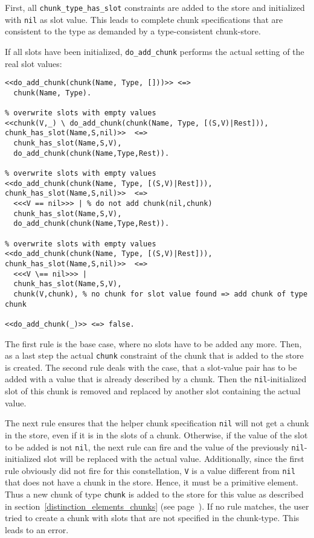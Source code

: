 First, all \lstinline|chunk_type_has_slot| constraints are added to the store and initialized with \lstinline|nil| as slot value. This leads to complete chunk specifications that are consistent to the type as demanded by a type-consistent chunk-store.

If all slots have been initialized, \lstinline|do_add_chunk| performs the actual setting of the real slot values:
  
\begin{lstlisting}[caption={Additional rules for adding chunks}]  
% base case
<<do_add_chunk(chunk(Name, Type, []))>> <=> 
  chunk(Name, Type). 

% overwrite slots with empty values
<<chunk(V,_) \ do_add_chunk(chunk(Name, Type, [(S,V)|Rest])), chunk_has_slot(Name,S,nil)>>  <=>
  chunk_has_slot(Name,S,V), 
  do_add_chunk(chunk(Name,Type,Rest)).

% overwrite slots with empty values  
<<do_add_chunk(chunk(Name, Type, [(S,V)|Rest])), chunk_has_slot(Name,S,nil)>>  <=> 
  <<<V == nil>>> | % do not add chunk(nil,chunk)
  chunk_has_slot(Name,S,V), 
  do_add_chunk(chunk(Name,Type,Rest)).  

% overwrite slots with empty values  
<<do_add_chunk(chunk(Name, Type, [(S,V)|Rest])), chunk_has_slot(Name,S,nil)>>  <=> 
  <<<V \== nil>>> |
  chunk_has_slot(Name,S,V), 
  chunk(V,chunk), % no chunk for slot value found => add chunk of type chunk 
  
<<do_add_chunk(_)>> <=> false.
\end{lstlisting}

The first rule is the base case, where no slots have to be added any more. Then, as a last step the actual \lstinline|chunk| constraint of the chunk that is added to the store is created. The second rule deals with the case, that a slot-value pair has to be added with a value that is already described by a chunk. Then the \lstinline|nil|-initialized slot of this chunk is removed and replaced by another slot containing the actual value. 

The next rule ensures that the helper chunk specification \lstinline|nil| will not get a chunk in the store, even if it is in the slots of a chunk. Otherwise, if the value of the slot to be added is not \lstinline|nil|, the next rule can fire and the value of the previously \lstinline|nil|-initialized slot will be replaced with the actual value. Additionally, since the first rule obviously did not fire for this constellation, \lstinline|V| is a value different from \lstinline|nil| that does not have a chunk in the store. Hence, it must be a primitive element. Thus a new chunk of type \lstinline|chunk| is added to the store for this value as described in section~\ref{distinction_elements_chunks} (see page~\pageref{distinction_elements_chunks}). If no rule matches, the user tried to create a chunk with slots that are not specified in the chunk-type. This leads to an error.

